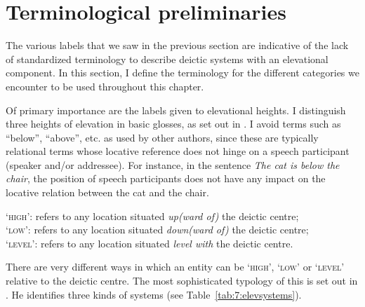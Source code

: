 \section{Terminological preliminaries}\label{sec:7:2}
The various labels that we saw in the previous section are indicative of the lack of standardized terminology to describe deictic systems with an elevational component. In this section, I define the terminology for the different categories we encounter to be used throughout this chapter. 

Of primary importance are the labels given to elevational heights. I distinguish three heights of elevation in basic glosses, as set out in . I avoid terms such as ``below'', ``above'', etc. as used by other authors, since these are typically relational terms whose locative reference does not hinge on a speech participant (speaker and/or addressee). For instance, in the sentence \textit{The cat is below the chair}, the position of speech participants does not have any impact on the locative relation between the cat and the chair. 




\ea \label{ex:7:1}
\upshape
`\textsc{high}':   refers to any location situated \textit{up(ward of)} the deictic centre;\\
`\textsc{low}':   refers to any location situated \textit{down(ward of)} the deictic centre;\\
`\textsc{level}':  refers to any location situated \textit{level with} the deictic centre.\\ 
\z


There are very different ways in which an entity can be `\textsc{high}', `\textsc{low}' or `\textsc{level}' relative to the deictic centre. The most sophisticated typology of this is set out in \citet{Burenhult2008}. He identifies three kinds of systems \citep[110-111]{Burenhult2008} (see Table~\ref{tab:7:elevsystems}).



